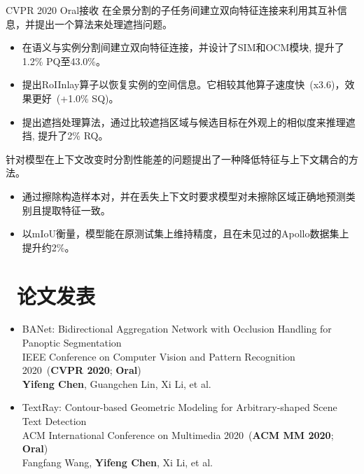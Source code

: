 \documentclass{resume}
\begin{document}
	 {CVPR 2020 Oral接收}
	在全景分割的子任务间建立双向特征连接来利用其互补信息，并提出一个算法来处理遮挡问题。
	\vspace{-0.2em}
	\begin{itemize}
		\item 在语义与实例分割间建立双向特征连接，并设计了SIM和OCM模块, 提升了1.2\% PQ至43.0\%。
		\item 提出RoIInlay算子以恢复实例的空间信息。它相较其他算子速度快~(x3.6)，效果更好~(+1.0\% SQ)。
		\item 提出遮挡处理算法，通过比较遮挡区域与候选目标在外观上的相似度来推理遮挡, 提升了2\% RQ。
	\end{itemize}
	\vspace{-0.25em}
	
	 {}
	针对模型在上下文改变时分割性能差的问题提出了一种降低特征与上下文耦合的方法。
	\vspace{-0.2em}
	\begin{itemize}
		\item 通过擦除构造样本对，并在丢失上下文时要求模型对未擦除区域正确地预测类别且提取特征一致。
		\item 以mIoU衡量，模型能在原测试集上维持精度，且在未见过的Apollo数据集上提升约2\%。
	\end{itemize}
	\vspace{-0.5em}
	
	\section{\faFileTextO\ 论文发表}
	\begin{itemize}
		\small
		\item BANet: Bidirectional Aggregation Network with Occlusion Handling for Panoptic Segmentation \\
		IEEE Conference on Computer Vision and Pattern Recognition 2020~(\textbf{CVPR 2020}; \textbf{Oral}) \\
		\textbf{Yifeng Chen}, Guangchen Lin, Xi Li, et al. 
		\item TextRay: Contour-based Geometric Modeling for Arbitrary-shaped Scene Text Detection \\
		ACM International Conference on Multimedia 2020~(\textbf{ACM MM 2020}; \textbf{Oral})\\
		Fangfang Wang, \textbf{Yifeng Chen}, Xi Li, et al. 
	\end{itemize}
	\vspace{-0.5em}	
\end{document}
